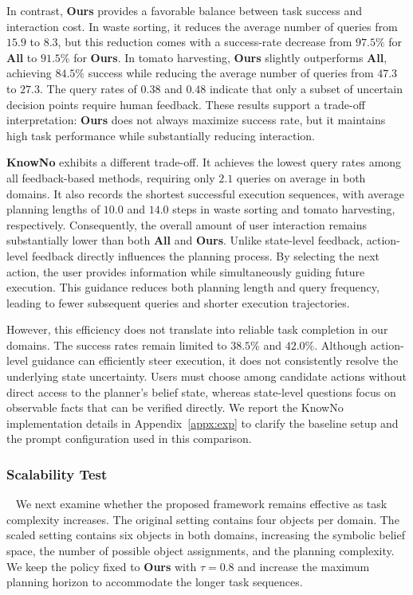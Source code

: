 In contrast, \textbf{Ours} provides a favorable balance between task success and interaction cost. In waste sorting, it reduces the average number of queries from $15.9$ to $8.3$, but this reduction comes with a success-rate decrease from $97.5\%$ for \textbf{All} to $91.5\%$ for \textbf{Ours}. In tomato harvesting, \textbf{Ours} slightly outperforms \textbf{All}, achieving $84.5\%$ success while reducing the average number of queries from $47.3$ to $27.3$. The query rates of $0.38$ and $0.48$ indicate that only a subset of uncertain decision points require human feedback. These results support a trade-off interpretation: \textbf{Ours} does not always maximize success rate, but it maintains high task performance while substantially reducing interaction.

\textbf{KnowNo} exhibits a different trade-off. It achieves the lowest query rates among all feedback-based methods, requiring only $2.1$ queries on average in both domains. It also records the shortest successful execution sequences, with average planning lengths of $10.0$ and $14.0$ steps in waste sorting and tomato harvesting, respectively. Consequently, the overall amount of user interaction remains substantially lower than both \textbf{All} and \textbf{Ours}. Unlike state-level feedback, action-level feedback directly influences the planning process. By selecting the next action, the user provides information while simultaneously guiding future execution. This guidance reduces both planning length and query frequency, leading to fewer subsequent queries and shorter execution trajectories.

However, this efficiency does not translate into reliable task completion in our domains. The success rates remain limited to $38.5\%$ and $42.0\%$. Although action-level guidance can efficiently steer execution, it does not consistently resolve the underlying state uncertainty. Users must choose among candidate actions without direct access to the planner's belief state, whereas state-level questions focus on observable facts that can be verified directly. We report the KnowNo implementation details in Appendix~\ref{appx:exp} to clarify the baseline setup and the prompt configuration used in this comparison.


\subsubsection{Scalability Test}~\label{exp:sys_scale}
We next examine whether the proposed framework remains effective as task complexity increases. The original setting contains four objects per domain. The scaled setting contains six objects in both domains, increasing the symbolic belief space, the number of possible object assignments, and the planning complexity. We keep the policy fixed to \textbf{Ours} with $\tau=0.8$ and increase the maximum planning horizon to accommodate the longer task sequences.


